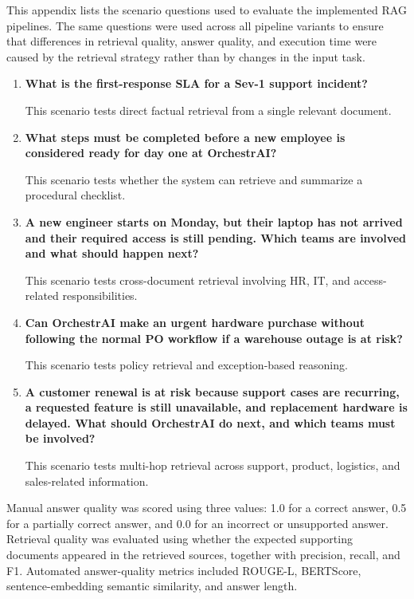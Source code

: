 This appendix lists the scenario questions used to evaluate the implemented RAG pipelines. The same questions were used across all pipeline variants to ensure that differences in retrieval quality, answer quality, and execution time were caused by the retrieval strategy rather than by changes in the input task.

\begin{enumerate}
    \item \textbf{What is the first-response SLA for a Sev-1 support incident?}
    
    This scenario tests direct factual retrieval from a single relevant document.

    \item \textbf{What steps must be completed before a new employee is considered ready for day one at OrchestrAI?}
    
    This scenario tests whether the system can retrieve and summarize a procedural checklist.

    \item \textbf{A new engineer starts on Monday, but their laptop has not arrived and their required access is still pending. Which teams are involved and what should happen next?}
    
    This scenario tests cross-document retrieval involving HR, IT, and access-related responsibilities.

    \item \textbf{Can OrchestrAI make an urgent hardware purchase without following the normal PO workflow if a warehouse outage is at risk?}
    
    This scenario tests policy retrieval and exception-based reasoning.

    \item \textbf{A customer renewal is at risk because support cases are recurring, a requested feature is still unavailable, and replacement hardware is delayed. What should OrchestrAI do next, and which teams must be involved?}
    
    This scenario tests multi-hop retrieval across support, product, logistics, and sales-related information.
\end{enumerate}

Manual answer quality was scored using three values: 1.0 for a correct answer, 0.5 for a partially correct answer, and 0.0 for an incorrect or unsupported answer. Retrieval quality was evaluated using whether the expected supporting documents appeared in the retrieved sources, together with precision, recall, and F1. Automated answer-quality metrics included ROUGE-L, BERTScore, sentence-embedding semantic similarity, and answer length.
